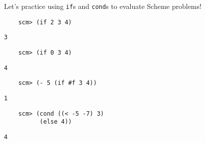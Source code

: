 \begin{blocksection}
Let's practice using \lstinline{if}s and \lstinline{cond}s to evaluate Scheme problems!

\begin{lstlisting}
    scm> (if 2 3 4)
\end{lstlisting}
\begin{solution}[.25in]
    \texttt{3}
\end{solution}

\begin{lstlisting}
    scm> (if 0 3 4)
\end{lstlisting}
\begin{solution}[.25in]
    \texttt{4}
\end{solution}

\begin{lstlisting}
    scm> (- 5 (if #f 3 4))
\end{lstlisting}
\begin{solution}[.25in]
    \texttt{1}
\end{solution}

\begin{lstlisting}
    scm> (cond ((< -5 -7) 3)
          (else 4))
\end{lstlisting}
\begin{solution}[.25in]
    \texttt{4}
\end{solution}
\end{blocksection}